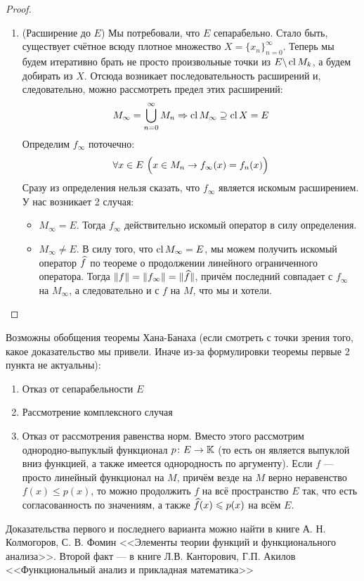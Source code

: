 \begin{proof}
\begin{enumerate}
		\item (Расширение до $E$) Мы потребовали, что $E$ сепарабельно. Стало быть, существует счётное всюду плотное множество $X = \{x_n\}_{n = 0}^\infty$. Теперь мы будем итеративно брать не просто произвольные точки из $E \backslash \operatorname{cl} M_k$, а будем добирать из $X$. Отсюда возникает последовательность расширений и, следовательно, можно рассмотреть предел этих расширений:
		\[
			M_\infty = \bigcup_{n = 0}^\infty M_n \Rightarrow \operatorname{cl} M_\infty \supseteq \operatorname{cl} X = E
		\]
		Определим $f_\infty$ поточечно:
		\[
			\forall x \in E\ \Big(x \in M_n \rightarrow f_\infty(x) = f_n(x)\Big)
		\]
		Сразу из определения нельзя сказать, что $f_\infty$ является искомым расширением. У нас возникает 2 случая:
		\begin{itemize}
			\item $M_\infty = E$. Тогда $f_\infty$ действительно искомый оператор в силу определения.
			
			\item $M_\infty \neq E$. В силу того, что $\operatorname{cl} M_\infty = E$, мы можем получить искомый оператор $\widehat{f}$ по теореме о продолжении линейного ограниченного оператора. Тогда $\|f\| = \|f_\infty\| = \|\widehat{f}\|$, причём последний совпадает с $f_\infty$ на $M_\infty$, а следовательно и с $f$ на $M$, что мы и хотели.
		\end{itemize}
	\end{enumerate}
\end{proof}

\begin{note}
	Возможны обобщения теоремы Хана-Банаха (если смотреть с точки зрения того, какое доказательство мы привели. Иначе из-за формулировки теоремы первые 2 пункта не актуальны):
	\begin{enumerate}
		\item Отказ от сепарабельности $E$
		
		\item Рассмотрение комплексного случая
		
		\item Отказ от рассмотрения равенства норм. Вместо этого рассмотрим \\ однородно-выпуклый функционал $p \colon E \to \mathbb{K}$ (то есть он является выпуклой вниз функцией, а также имеется однородность по аргументу). Если $f$ --- просто линейный функционал на $M$, причём везде на $M$ верно неравенство $f(x) \le p(x)$, то можно продолжить $f$ на всё пространство $E$ так, что есть согласованность по значениям, а также $\widehat{f}(x) \leqslant p(x)$ на всём $E$.
	\end{enumerate}
	Доказательства первого и последнего варианта можно найти в книге А. Н. Колмогоров, С. В. Фомин <<Элементы теории функций и функционального анализа>>. Второй факт --- в книге Л.В. Канторович, Г.П. Акилов <<Функциональный анализ и прикладная математика>>
\end{note}